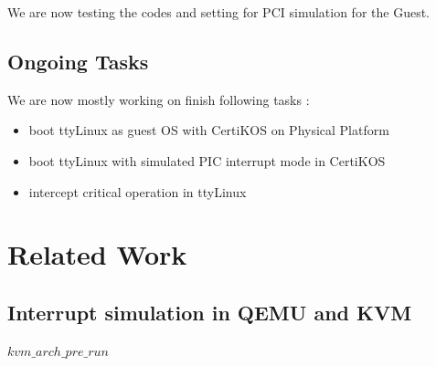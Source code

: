 \documentclass[a4paper,12pt]{article}
\begin{document}
We are now testing the codes and setting for PCI simulation for the Guest.

\subsection{Ongoing Tasks }
We are now mostly working on finish following tasks :
\begin{itemize}
\item boot ttyLinux as guest OS with CertiKOS on Physical Platform
\item boot ttyLinux with simulated PIC interrupt mode  in CertiKOS
\item intercept  critical operation in ttyLinux
\end{itemize}


\section{Related Work}

\subsection{Interrupt simulation in QEMU and KVM}
$kvm\_arch\_pre\_run$





\end{document}
